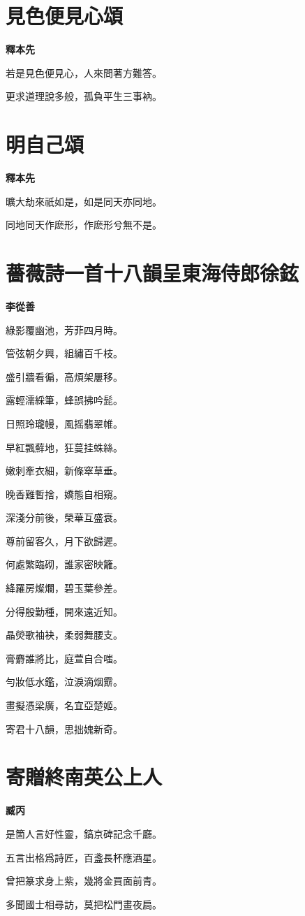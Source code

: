 \documentclass[12pt,a4paper]{ctexbook}
\begin{document}
\section{見色便見心頌}
\textbf{釋本先}\par\vspace{0.5em}
若是見色便見心，人來問著方難答。\par
更求道理說多般，孤負平生三事衲。\par

\section{明自己頌}
\textbf{釋本先}\par\vspace{0.5em}
曠大劫來祇如是，如是同天亦同地。\par
同地同天作麽形，作麽形兮無不是。\par

\section{薔薇詩一首十八韻呈東海侍郎徐鉉}
\textbf{李從善}\par\vspace{0.5em}
綠影覆幽池，芳菲四月時。\par
管弦朝夕興，組繡百千枝。\par
盛引牆看徧，高煩架屢移。\par
露輕濡綵筆，蜂誤拂吟髭。\par
日照玲瓏幔，風摇翡翠帷。\par
早紅飄蘚地，狂蔓挂蛛絲。\par
嫩刺牽衣細，新條窣草垂。\par
晚香難暫捨，嬌態自相窺。\par
深淺分前後，榮華互盛衰。\par
尊前留客久，月下欲歸遲。\par
何處繁臨砌，誰家密映籬。\par
絳羅房燦爛，碧玉葉參差。\par
分得殷勤種，開來遠近知。\par
晶熒歌袖袂，柔弱舞腰支。\par
膏麝誰將比，庭萱自合嗤。\par
勻妝低水鑑，泣淚滴烟𩅰。\par
畫擬憑梁廣，名宜亞楚姬。\par
寄君十八韻，思拙媿新奇。\par

\section{寄贈終南英公上人}
\textbf{臧丙}\par\vspace{0.5em}
是箇人言好性靈，鎬京碑記念千廳。\par
五言出格爲詩匠，百盞長杯應酒星。\par
曾把篆求身上紫，幾將金買面前青。\par
多聞國士相尋訪，莫把松門畫夜扃。\par
\end{document}
